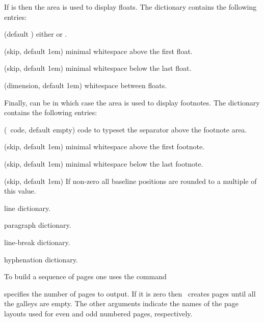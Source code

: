 If  is  then the area is used to display floats.
The dictionary  contains the following entries\?:
\begin{longdescription}
\item{\quad (default )}
  either  or .
\item{\quad (skip, default 1em)}
  minimal whitespace above the first float.
\item{\quad (skip, default 1em)}
  minimal whitespace below the last float.
\item{\quad (dimension, default 1em)}
  whitespace between floats.
\end{longdescription}

Finally,  can be  in which case the area is used to display footnotes.
The dictionary  contains the following entries\?:
\begin{longdescription}
\item{\quad (\ant\ code, default empty)}
  code to typeset the separator above the footnote area.
\item{\quad (skip, default 1em)}
  minimal whitespace above the first footnote.
\item{\quad (skip, default 1em)}
  minimal whitespace below the last footnote.
\item{\quad (skip, default 1em)}
  If non-zero all baseline positions are rounded to a multiple of this value.
\item{}
  line dictionary.
\item{}
  paragraph dictionary.
\item{}
  line-break dictionary.
\item{}
  hyphenation dictionary.
\end{longdescription}

To build a sequence of pages one uses the command
\begin{code}
  \cs{\shipoutpages}   
\end{code}
 specifies the number of pages to output. If it is zero then \ant\ creates
pages until all the galleys are empty. The other arguments indicate the names of the page layouts
used for even and odd numbered pages, respectively.

